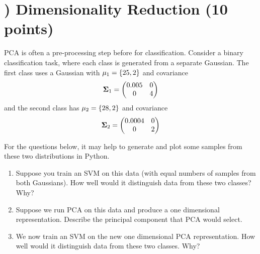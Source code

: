 \documentclass[11pt]{article}
\newcommand{\msigma}{{\bf \Sigma}}
\newcommand{\vmu}{{\bf \mu}}
\newcounter{QuestionCounter}
\newcounter{SubQuestionCounter}[QuestionCounter]
\newcommand{\newquestion}{\stepcounter{QuestionCounter}\setcounter{SubQuestionCounter}{1}\newpage}
\begin{document}
\section*{) Dimensionality Reduction (10 points) }{
 PCA is often a pre-processing step before for classification. Consider a binary classification task, where each class is generated from a separate Gaussian. The first class uses a Gaussian with $\vmu_1 = \{25, 2\}$ and covariance 
\[
\msigma_1=
\begin{pmatrix}
0.005 & 0  \\
0 & 4 
\end{pmatrix} \]
and the second class has $\vmu_2 = \{28, 2\}$ and covariance 
\[
\msigma_2=
\begin{pmatrix}
0.0004 & 0  \\
0 & 2 
\end{pmatrix} \]

For the questions below, it may help to generate and plot some samples from these two distributions in Python.

\begin{enumerate}[label=(\alph*)]
\item Suppose you train an SVM on this data (with equal numbers of samples from both Gaussians). How well would it distinguish data from these two classes? Why?

\begin{answertext}{5cm}{}

\end{answertext}

\item Suppose we run PCA on this data and produce a one dimensional representation. Describe the principal component that PCA would select.

\begin{answertext}{5cm}{}

\end{answertext}
\newpage
\item We now train an SVM on the new one dimensional PCA representation. How well would it distinguish data from these two classes. Why?

\begin{answertext}{5cm}{}

\end{answertext}
\end{enumerate}
}

\newquestion
\end{document}
